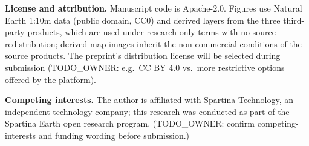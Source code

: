 \documentclass[11pt]{article}
\begin{document}
\vspace{4pt}

\noindent\textbf{License and attribution.} Manuscript code is
Apache-2.0. Figures use Natural Earth 1:10m data (public domain, CC0) and
derived layers from the three third-party products, which are used under
research-only terms with no source redistribution; derived map images
inherit the non-commercial conditions of the source products. The
preprint's distribution license will be selected during submission
(TODO\_OWNER: e.g.\ CC BY 4.0 vs.\ more restrictive options offered by the
platform).

\vspace{4pt}

\noindent\textbf{Competing interests.} The author is affiliated with
Spartina Technology, an independent technology company; this research was
conducted as part of the Spartina Earth open research program.
(TODO\_OWNER: confirm competing-interests and funding wording before
submission.)
\end{document}
